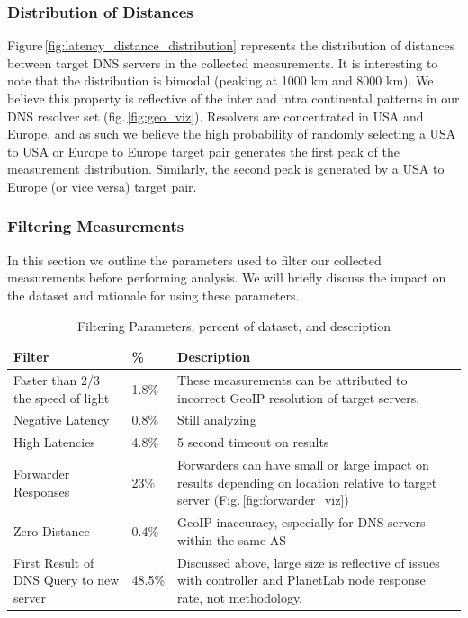 \subsubsection{Distribution of Distances}
Figure\,\ref{fig:latency_distance_distribution} represents the distribution of distances between target DNS servers in the collected measurements. It is interesting to note that the distribution is bimodal (peaking at 1000 km and 8000 km). We believe this property is reflective of the inter and intra continental patterns in our DNS resolver set (fig.\,\ref{fig:geo_viz}). Resolvers are concentrated in USA and Europe, and as such we believe the high probability of randomly selecting a USA to USA or Europe to Europe target pair generates the first peak of the measurement distribution. Similarly, the second peak is generated by a USA to Europe (or vice versa) target pair.

\subsubsection{Filtering Measurements}
In this section we outline the parameters used to filter our collected measurements before performing analysis. We will briefly discuss the impact on the dataset and rationale for using these parameters.

\begin{table}[!htb]
  \begin{tabular}{p{2.3cm} | p{.6cm} | p{4.6cm}}
    \hline
    Filter & \% & Description \\
    \hline
    Faster than 2/3 the speed of light & 1.8\% & These measurements can be attributed to incorrect GeoIP resolution of target servers. \\
	\hline
	Negative Latency & 0.8\% & Still analyzing \\
	\hline
	High Latencies & 4.8\% & 5 second timeout on results \\
	\hline
	Forwarder Responses & 23\% & Forwarders can have small or large impact on results depending on location relative to target server (Fig.\,\ref{fig:forwarder_viz}) \\
	\hline
	Zero Distance & 0.4\% & GeoIP inaccuracy, especially for DNS servers within the same AS \\
	\hline
	First Result of DNS Query to new server & 48.5\% & Discussed above, large size is reflective of issues with controller and PlanetLab node response rate, not methodology. \\
    \hline
  \end{tabular}
  \caption{Filtering Parameters, percent of dataset, and description}
  \label{tab:filter}
\end{table}

